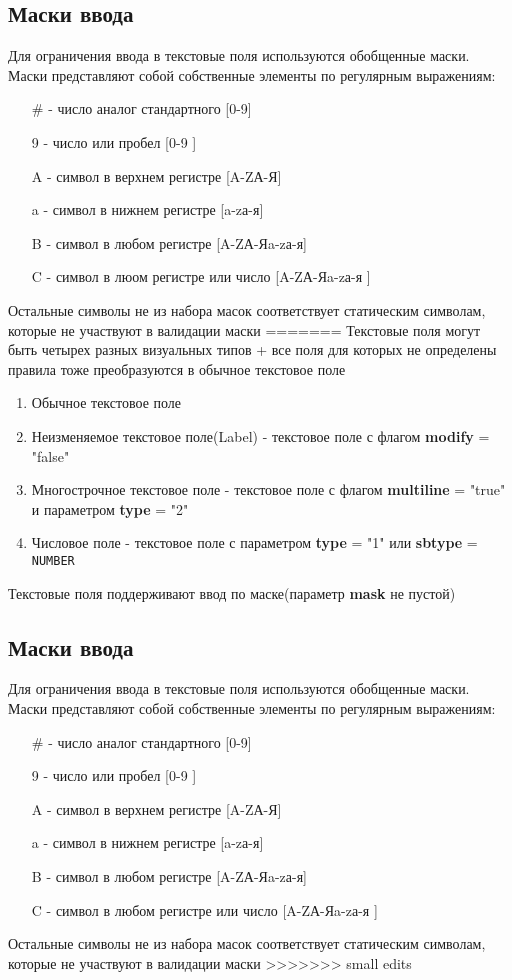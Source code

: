 \documentclass[../index.tex]{subfiles}
\begin{document}
    \subsection{Маски ввода}
        Для ограничения ввода в текстовые поля используются обобщенные маски. Маски представляют собой собственные элементы по регулярным выражениям:
        \begin{enumerate}
            \item[\#] - число аналог стандартного [0-9]
            \item[9] - число или пробел [0-9 ]
            \item[A] - символ в верхнем регистре [A-ZА-Я]
            \item[a] - символ в нижнем регистре [a-zа-я]
            \item[B] - символ в любом регистре [A-ZА-Яa-zа-я]
            \item[C] - символ в люом регистре или число [A-ZА-Яa-zа-я ]
        \end{enumerate}
        Остальные символы не из набора масок соответствует статическим символам, которые не участвуют в валидации маски
=======
	Текстовые поля могут быть четырех разных визуальных типов + все поля для которых не определены правила тоже преобразуются в обычное текстовое поле
	\begin{enumerate}
		\item Обычное текстовое поле
		\item Неизменяемое текстовое поле(Label) - текстовое поле с флагом \textbf{modify} = "false"
		\item Многострочное текстовое поле - текстовое поле с флагом \textbf{multiline} = "true" и параметром \textbf{type} = "2"
		\item Числовое поле - текстовое поле с параметром \textbf{type} = "1" или \textbf{sbtype} = \verb|NUMBER|
	\end{enumerate}
	Текстовые поля поддерживают ввод по маске(параметр \textbf{mask} не пустой)

	\subsection{Маски ввода}
		Для ограничения ввода в текстовые поля используются обобщенные маски. Маски представляют собой собственные элементы по регулярным выражениям:
		\begin{enumerate}
			\item[\#] - число аналог стандартного [0-9]
			\item[9] - число или пробел [0-9 ]
			\item[A] - символ в верхнем регистре [A-ZА-Я]
			\item[a] - символ в нижнем регистре [a-zа-я]
			\item[B] - символ в любом регистре [A-ZА-Яa-zа-я]
			\item[C] - символ в любом регистре или число [A-ZА-Яa-zа-я ]
		\end{enumerate}
		Остальные символы не из набора масок соответствует статическим символам, которые не участвуют в валидации маски
>>>>>>> small edits
\end{document}
